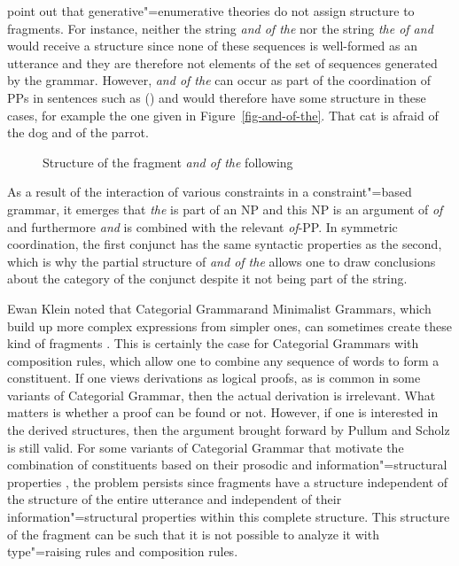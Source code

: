 \mbox{}\citet[Section~3.2]{PS2001a} point out that generative"=enumerative theories do not assign structure to fragments.
For instance, neither the string \emph{and of the} nor the string \emph{the of and} would receive a
structure since none of these sequences is well-formed as an utterance and they are therefore not elements of the set of sequences generated by the grammar. However, \emph{and of the}
can occur as part of the coordination of PPs in sentences such as () and would therefore have some structure in these cases,
for example the one given in Figure~\vref{fig-and-of-the}.%
\ea
That cat is afraid of the dog and of the parrot.
\z
\begin{figure}
\centering
{}
\caption{\label{fig-and-of-the}Structure of the fragment \emph{and of the} following
  }
\end{figure}%
As a result of the interaction of various constraints in a constraint"=based grammar, it emerges that \emph{the}
is part of an NP and this NP is an argument of \emph{of} and furthermore \emph{and} is combined with the relevant
\emph{of}-PP. In symmetric coordination, the first conjunct has the same syntactic properties as the second, which
is why the partial structure of \emph{and of the} allows one to draw conclusions about the category of the conjunct
despite it not being part of the string.

Ewan Klein noted that Categorial Grammar\indexcg and Minimalist Grammars, which build up more complex
expressions from simpler ones, can sometimes create these kind of fragments \citep[]{Pullum2013a}.
This is certainly the case for Categorial Grammars with composition rules, which allow one to
combine any sequence of words to form a constituent. If one views derivations as logical proofs, as
is common in some variants of Categorial Grammar, then the actual derivation is irrelevant. What matters is whether a
proof can be found or not. However, if one is interested in the derived structures, then the argument brought forward by Pullum and Scholz is still
valid. For some variants of Categorial Grammar that motivate the combination of constituents based on their prosodic
and information"=structural properties \citep[Section~3]{Steedman91a}, the problem persists since fragments have
a structure independent of the structure of the entire utterance and independent of their
information"=structural properties within this complete structure. This structure of the fragment
can be such that it is not possible to analyze it with type"=raising rules and composition
rules.


